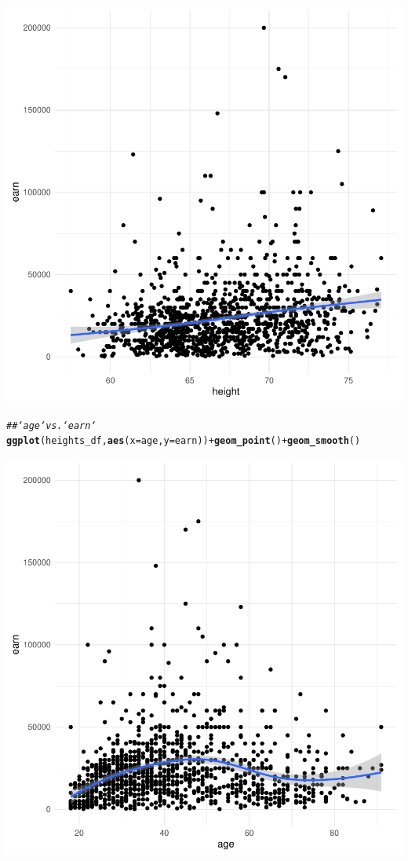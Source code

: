 \documentclass{article}\usepackage[]{graphicx}\usepackage[]{xcolor}
\makeatletter
\newcommand{\hlcom}[1]{\textcolor[rgb]{0.678,0.584,0.686}{\textit{#1}}}%
\newcommand{\hlopt}[1]{\textcolor[rgb]{0,0,0}{#1}}%
\newcommand{\hlstd}[1]{\textcolor[rgb]{0.345,0.345,0.345}{#1}}%
\newcommand{\hlkwc}[1]{\textcolor[rgb]{0.333,0.667,0.333}{#1}}%
\newcommand{\hlkwd}[1]{\textcolor[rgb]{0.737,0.353,0.396}{\textbf{#1}}}%
\newenvironment{kframe}{%
 \def\at@end@of@kframe{}%
 \ifinner\ifhmode%
  \def\at@end@of@kframe{\end{minipage}}%
  \begin{minipage}{\columnwidth}%
 \fi\fi%
 \def\FrameCommand##1{\hskip\@totalleftmargin \hskip-\fboxsep
 \colorbox{shadecolor}{##1}\hskip-\fboxsep
     \hskip-\linewidth \hskip-\@totalleftmargin \hskip\columnwidth}%
 \MakeFramed {\advance\hsize-\width
   \@totalleftmargin\z@ \linewidth\hsize
   \@setminipage}}%
 {\par\unskip\endMakeFramed%
 \at@end@of@kframe}
\newenvironment{knitrout}{}{} %
\makeatother
\begin{document}
\begin{knitrout}
\begin{kframe}
{\ttfamily\noindent\itshape{}}\end{kframe}

{\centering \includegraphics[width=.6\linewidth]{figure/assignment-03-ChattapadhyayKausik-Rnwauto-report-4} 

}


\begin{kframe}\begin{alltt}
\hlcom{## `age` vs. `earn`}
\hlkwd{ggplot}\hlstd{(heights_df,} \hlkwd{aes}\hlstd{(}\hlkwc{x}\hlstd{=age,} \hlkwc{y}\hlstd{=earn))} \hlopt{+} \hlkwd{geom_point}\hlstd{()} \hlopt{+} \hlkwd{geom_smooth}\hlstd{()}
\end{alltt}


{\ttfamily\noindent\itshape{}}\end{kframe}

{\centering \includegraphics[width=.6\linewidth]{figure/assignment-03-ChattapadhyayKausik-Rnwauto-report-5} 

}
\end{knitrout}
\end{document}
